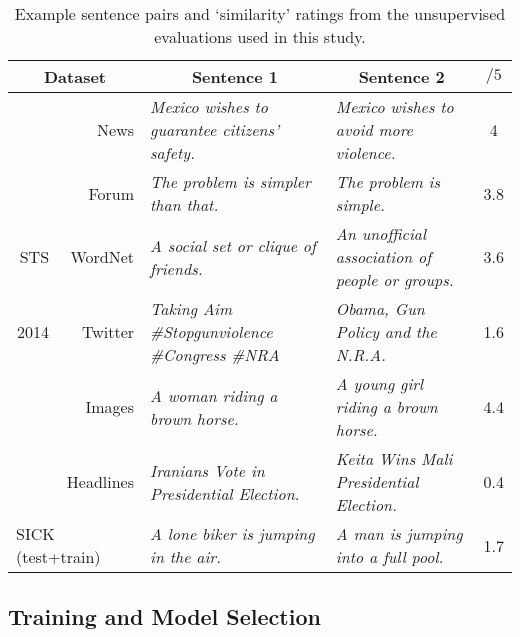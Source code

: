 \begin{table*}[ht]
\begin{adjustwidth}{-1.6cm}{}
\renewcommand{\tabcolsep}{4.6pt}
\footnotesize
\newcommand{\mc}[1]{\multicolumn{1}{l|}{#1}}
  \begin{center}

      {
        \begin{tabular}{rr|l|l|c}
          \multicolumn{2}{c|}{Dataset} & \multicolumn{1}{c}{Sentence 1} &\multicolumn{1}{|c|}{Sentence 2} & \(/5\)  \\
          \hline
          \hline
           & News & \emph{Mexico wishes to guarantee citizens' safety.} &\emph{Mexico wishes to avoid more violence.} & 4 \\
           & Forum &  \emph{The problem is simpler than that.} &  \emph{The problem is simple.}  & 3.8 \\
           STS & WordNet &  \emph{A social set or clique of friends.} &  \emph{An unofficial association of people or groups.} & 3.6 \\
           2014 & Twitter & \emph{Taking Aim  \#Stopgunviolence \#Congress \#NRA} & \emph{Obama, Gun Policy and the N.R.A.}  & 1.6 \\
            & Images & \emph{A woman riding a brown horse.} &  \emph{A young girl riding a brown horse.} & 4.4 \\
           & Headlines &  \emph{Iranians Vote in Presidential Election.} &  \emph{Keita Wins Mali Presidential Election.} & 0.4  \\
          \hline
          \multicolumn{2}{l|}{SICK (test+train)} & \emph{A lone biker is jumping in the air.} & \emph{A man is jumping into a full pool.}  & 1.7 \\
          \hline 
        \end{tabular}

    }
      \end{center}
      \end{adjustwidth}
    \caption{\label{unsex} Example sentence pairs and `similarity' ratings from the unsupervised evaluations used in this study.}

  \vspace*{-4ex}

\end{table*}

\subsection{Training and Model Selection}



